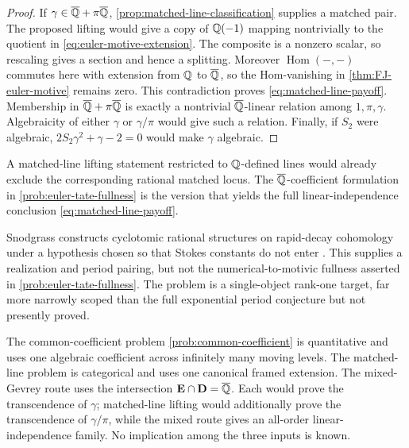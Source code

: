 \begin{proof}
If \(\gamma\in\overline{\mathbb Q}+\pi\overline{\mathbb Q}\),
\cref{prop:matched-line-classification} supplies a matched pair.  The
proposed lifting would give a copy of \(\mathbb Q(-1)\) mapping nontrivially to the quotient
in \eqref{eq:euler-motive-extension}.  The composite is a nonzero scalar,
so rescaling gives a section and hence a splitting.  Moreover
\(\operatorname{Hom}(-,-)\) commutes here with extension from \(\mathbb Q\) to
\(\overline{\mathbb Q}\), so the Hom-vanishing in \cref{thm:FJ-euler-motive} remains
zero.  This contradiction proves \eqref{eq:matched-line-payoff}.  Membership
in \(\overline{\mathbb Q}+\pi\overline{\mathbb Q}\) is exactly a nontrivial \(\overline{\mathbb Q}\)-linear relation
among \(1,\pi,\gamma\).  Algebraicity of either \(\gamma\) or
\(\gamma/\pi\) would give such a relation.  Finally, if \(S_2\) were
algebraic, \(2S_2\gamma^2+\gamma-2=0\) would make \(\gamma\) algebraic.
\end{proof}

\begin{remark}
A matched-line lifting statement restricted to \(\mathbb Q\)-defined lines would
already exclude the corresponding rational matched locus.  The
\(\overline{\mathbb Q}\)-coefficient formulation in \cref{prob:euler-tate-fullness} is the
version that yields the full linear-independence conclusion
\eqref{eq:matched-line-payoff}.
\end{remark}

\begin{remark}
Snodgrass constructs cyclotomic rational structures on rapid-decay
cohomology under a hypothesis chosen so that Stokes constants do not enter
\cite[\S1.2]{Snodgrass2026}.  This supplies a realization and period pairing,
but not the numerical-to-motivic fullness asserted in
\cref{prob:euler-tate-fullness}.  The problem is a single-object rank-one
target, far more narrowly scoped than the full exponential period conjecture
but not presently proved.
\end{remark}

\begin{remark}
The common-coefficient problem \cref{prob:common-coefficient} is quantitative
and uses one algebraic coefficient across infinitely many moving levels.
The matched-line problem is categorical and uses one canonical framed
extension.  The mixed-Gevrey route uses the intersection
\(\mathbf E\cap\mathbf D=\overline{\mathbb Q}\).  Each would prove the transcendence of
\(\gamma\); matched-line lifting would additionally prove the
transcendence of \(\gamma/\pi\), while the mixed route gives an all-order
linear-independence family.  No implication among the three inputs is known.
\end{remark}

